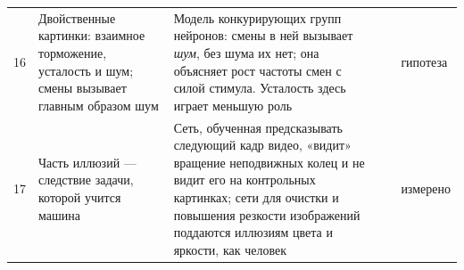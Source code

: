 {\begin{longtable}{>{\raggedright}p{0.5cm}>{\raggedright}p{4.0cm}>{\raggedright}p{5.6cm}>{\raggedright}p{2.3cm}>{\raggedright\arraybackslash}p{1.7cm}}
16 & Двойственные картинки: взаимное торможение, усталость и шум; смены вызывает главным образом шум & Модель конкурирующих групп нейронов: смены в ней вызывает \emph{шум}, без шума их нет; она объясняет рост частоты смен с силой стимула. Усталость здесь играет меньшую роль & \cite{MorenoBote2007} & гипотеза \\
17 & Часть иллюзий --- следствие задачи, которой учится машина & Сеть, обученная предсказывать следующий кадр видео, «видит» вращение неподвижных колец и не видит его на контрольных картинках; сети для очистки и повышения резкости изображений поддаются иллюзиям цвета и яркости, как человек & \cite{Watanabe2018,GomezVilla2020} & измерено \\
\bottomrule
\end{longtable}}
